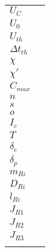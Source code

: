 \begin{table}[h]
\begin{tabular}{@{}ll@{}}
        \( U_C \) & \\
        \( U_0 \) & \\
        \( U_{th} \) & \\
        \( \Delta t_{th} \) & \\
        \( \chi \) & \\
        \( \chi' \) & \\
        \( C_{max} \) & \\
        \( n \) & \\
        \( s \) & \\
        \( o \) & \\
        \( I_c \) & \\
        \( T \) & \\
        \( \delta_e \) & \\
        \( \delta_p \) & \\
        \( m_{Ri} \) & \\
        \( D_{Ri} \) & \\
        \( l_{Ri} \) & \\
        \( J_{R1} \) & \\
        \( J_{R2} \) & \\
        \( J_{R3} \) & \\
        \(  \) & \\
    \end{tabular}
    \label{tab:glossar}
\end{table}